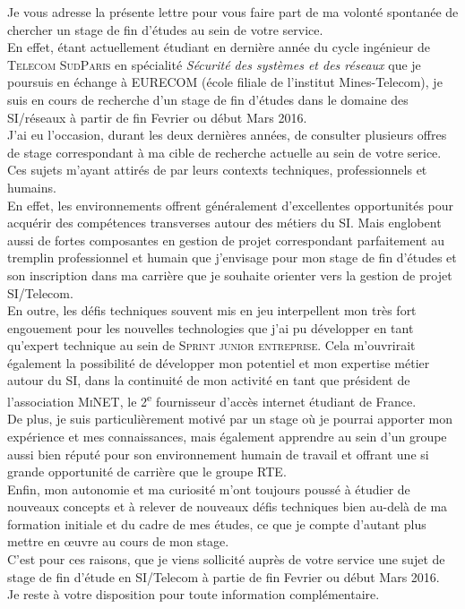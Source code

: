 \documentclass[10pt,a4paper,roman]{moderncv} %
\begin{document}
\quad \quad Je vous adresse la présente lettre pour vous faire part de ma volonté spontanée de chercher un stage de fin d'études au sein de votre
service.\\[0.3cm]
\quad \quad En effet, étant actuellement étudiant en dernière année du cycle ingénieur de \textsc{Telecom SudParis} en spécialité
\textit{Sécurité des systèmes et des réseaux} que je poursuis en échange à EURECOM (école filiale de l'institut Mines-Telecom), je suis en cours
de recherche d'un stage de fin d'études dans le domaine des SI/réseaux à partir de fin Fevrier ou début Mars 2016.\\[0.3cm]
\quad \quad J'ai eu l'occasion, durant les deux dernières années, de consulter plusieurs offres de stage correspondant à ma cible de recherche actuelle
au sein de votre serice. Ces sujets m'ayant attirés de par leurs contexts techniques, professionnels et humains.\\
En effet, les environnements offrent généralement d'excellentes opportunités pour acquérir des compétences transverses autour des métiers du SI.
Mais englobent aussi de fortes composantes en gestion de projet correspondant parfaitement au tremplin professionnel et humain que j'envisage pour mon
stage de fin d'études et son inscription dans ma carrière que je souhaite orienter vers la gestion de projet SI/Telecom.\\
En outre, les défis techniques souvent mis en jeu interpellent mon très fort engouement pour les nouvelles technologies que j'ai pu
développer en tant qu'expert technique au sein de \textsc{Sprint junior entreprise}. Cela m'ouvrirait également la possibilité de développer mon
potentiel et mon expertise métier autour du SI, dans la continuité de mon activité en tant que président de l'association \textsc{MiNET},
le 2\textsuperscript{e} fournisseur d'accès internet étudiant de France.\\
De plus, je suis particulièrement motivé par un stage où je pourrai apporter mon expérience et mes connaissances, mais également
apprendre au sein d'un groupe aussi bien réputé pour son environnement humain de travail et offrant une si grande opportunité
de carrière que le groupe \textsc{RTE}.\\
Enfin, mon autonomie et ma curiosité m'ont toujours poussé à étudier de nouveaux concepts et à relever de nouveaux défis techniques bien au-delà de ma
formation initiale et du cadre de mes études, ce que je compte d'autant plus mettre en \oe uvre au cours de mon stage.\\
C'est pour ces raisons, que je viens sollicité auprès de votre service une sujet de stage de fin d'étude en SI/Telecom à partie de
fin Fevrier ou début Mars 2016.\\[0.3cm]
Je reste à votre disposition pour toute information complémentaire. \\[1cm]

\makeletterclosing %

\end{document}
